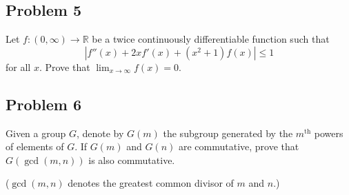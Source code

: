 \documentclass{article}
\begin{document}
\subsection*{Problem 5}
Let \( f : (0, \infty) \to \mathbb{R} \) be a twice continuously differentiable function such that
\[
\left| f''(x) + 2x f'(x) + (x^2 + 1) f(x) \right| \leq 1
\]
for all \( x \). Prove that \( \displaystyle \lim_{x \to \infty} f(x) = 0 \).

\subsection*{Problem 6}
Given a group \( G \), denote by \( G(m) \) the subgroup generated by the \( m^{\text{th}} \) powers of elements of \( G \). If \( G(m) \) and \( G(n) \) are commutative, prove that \( G(\gcd(m,n)) \) is also commutative.

(\( \gcd(m,n) \) denotes the greatest common divisor of \( m \) and \( n \).)
\end{document}
